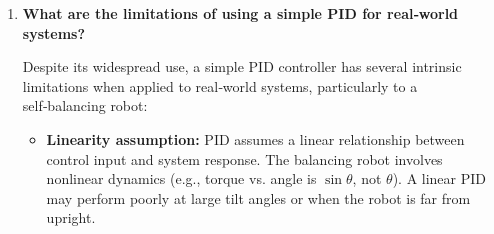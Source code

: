 \documentclass[12pt,a4paper]{article}
\begin{document}
\begin{enumerate}[leftmargin=*, label=\textbf{Q\arabic*}]
		\textbf{Strategy for final fine‑tuning:}
		\begin{itemize}
			\item \textbf{Iterative refinement:}
			\begin{enumerate}
				\item With $K_i=K_d=0$, increase $K_p$ until the robot oscillates with 
				constant amplitude (ultimate gain $K_u$). Note the oscillation period 
				$T_u$.
				\item Add derivative gain to damp the oscillations, reducing $K_p$ 
				slightly if necessary.
				\item Introduce a small integral gain to cancel any steady‑state offset, 
				observing the telemetry for any slow oscillation (integral windup).
				\item Adjust gains in steps of $\pm 20\%$ while observing the real‑time 
				plot of angle and motor command.
			\end{enumerate}
			\item \textbf{Telemetry‑driven debugging:} The telemetry string 
			\texttt{"\%0.3f,\%0.3f,\%d,\%0.2f,\%0.2f"} provides angle, gyro rate, 
			motor command, and encoder frequencies. Plotting these in real time helps 
			visualise overshoot, settling time, and noise.
			\item \textbf{Motor encoder feedback:} The encoder data (left and right 
			frequencies) can be used to implement an additional inner speed loop in 
			future iterations, reducing the burden on the angle PID.
			\item \textbf{Physical consistency:} Ensure the robot’s mechanical structure 
			(battery placement, sensor alignment, wheel grip) is fixed before final 
			tuning, so that the tuned gains remain valid.
		\end{itemize}
		
		\item \textbf{What are the limitations of using a simple PID for real‑world 
			systems?}
		
		Despite its widespread use, a simple PID controller has several intrinsic 
		limitations when applied to real‑world systems, particularly to a self‑balancing 
		robot:
		
		\begin{itemize}
			\item \textbf{Linearity assumption:} PID assumes a linear relationship 
			between control input and system response. The balancing robot involves 
			nonlinear dynamics (e.g., torque vs. angle is $\sin\theta$, not $\theta$). 
			A linear PID may perform poorly at large tilt angles or when the robot is 
			far from upright.
			

\end{itemize}
\end{enumerate}
\end{document}
